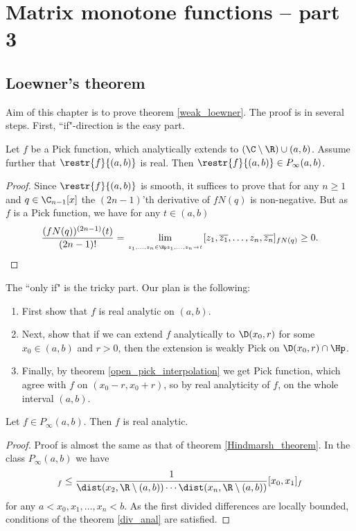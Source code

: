 \chapter{Matrix monotone functions -- part 3}

\section{Loewner's theorem}

Aim of this chapter is to prove theorem \ref{weak_loewner}. The proof is in several steps. First, ``if"-direction is the easy part.

\begin{lem}\label{weak_loewner_converse}
	Let $f$ be a Pick function, which analytically extends to $(\C \setminus \R) \cup (a, b)$. Assume further that $\restr{f}{(a, b)}$ is real. Then $\restr{f}{(a, b)} \in P_{\infty}(a, b)$.
\end{lem}
\begin{proof}
	Since $\restr{f}{(a, b)}$ is smooth, it suffices to prove that for any $n \geq 1$ and $q \in \C_{n - 1}[x]$ the $(2n - 1)$'th derivative of $f N(q)$ is non-negative. But as $f$ is a Pick function, we have for any $t \in (a, b)$
	\begin{align*}
		\frac{(f N(q))^{(2 n - 1)}(t)}{(2 n - 1)!} = \lim_{\atop{z_{1}, \ldots, z_{n} \in \Hp}{z_{1}, \ldots, z_{n} \to t}} [z_{1}, \overline{z_{1}}, \ldots, z_{n}, \overline{z_{n}}]_{f N(q)} \geq 0.
	\end{align*}
\end{proof}

The ``only if" is the tricky part. Our plan is the following:
\begin{enumerate}
	\item First show that $f$ is real analytic on $(a, b)$.
	\item Next, show that if we can extend $f$ analytically to $\D(x_{0}, r)$ for some $x_{0} \in (a, b)$ and $r > 0$, then the extension is weakly Pick on $\D(x_{0}, r) \cap \Hp$.
	\item Finally, by theorem \ref{open_pick_interpolation} we get Pick function, which agree with $f$ on $(x_{0} - r, x_{0} + r)$, so by real analyticity of $f$, on the whole interval $(a, b)$.
\end{enumerate}

\begin{lem}\label{loewner_analytic}
	Let $f \in P_{\infty}(a, b)$. Then $f$ is real analytic.
\end{lem}
\begin{proof}
	Proof is almost the same as that of theorem \ref{Hindmarsh_theorem}. In the class $P_{\infty}(a, b)$ we have
	\begin{align*}
		[x_{0}, x_{1}, \ldots, x_{n}]_{f} \leq \frac{1}{\dist(x_{2}, \R \setminus (a, b)) \cdots \dist(x_{n}, \R \setminus (a, b))} [x_{0}, x_{1}]_{f}
	\end{align*}
	for any $a < x_{0}, x_{1}, \ldots, x_{n} < b$. As the first divided differences are locally bounded, conditions of the theorem \ref{div_anal} are satisfied.
\end{proof}

